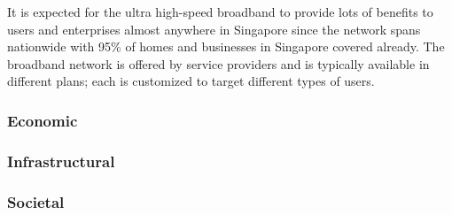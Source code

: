 \documentclass[a4paper,10pt]{article}
\begin{document}
It is expected for the ultra high-speed broadband to provide lots of benefits to users and enterprises almost anywhere in Singapore since the network spans nationwide with 95\% of homes and businesses in Singapore covered already. The broadband network is offered by service providers and is typically available in different plans; each is customized to target different types of users.

\subsubsection{Economic}

\subsubsection{Infrastructural}

\subsubsection{Societal}


 

\end{document}
